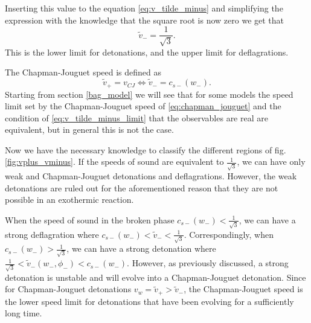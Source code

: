 Inserting this value to the equation \ref{eq:v_tilde_minus} and simplifying the expression with the knowledge that the square root is now zero
we get that
\begin{equation}
\tilde{v}_- = \frac{1}{\sqrt{3}}.
\label{eq:v_tilde_minus_limit}
\end{equation}
This is the lower limit for detonations, and the upper limit for deflagrations.

The Chapman-Jouguet speed is defined as
\begin{equation}
\tilde{v}_+=v_{CJ} \Leftrightarrow \tilde{v}_- = c_{s-}(w_-).
\label{eq:chapman_jouguet}
\end{equation}
Starting from section \ref{bag_model} we will see that for some models the speed limit set by the Chapman-Jouguet speed of \ref{eq:chapman_jouguet}
and the condition of \ref{eq:v_tilde_minus_limit} that the observables are real are equivalent,
but in general this is not the case.

Now we have the necessary knowledge to classify the different regions of fig. \ref{fig:vplus_vminus}.
If the speeds of sound are equivalent to $\frac{1}{\sqrt{3}}$,
we can have only weak and Chapman-Jouguet detonations and deflagrations.
However, the weak detonations are ruled out for the aforementioned reason that they are not possible in an exothermic reaction.

When the speed of sound in the broken phase $c_{s-}(w_-) < \frac{1}{\sqrt{3}}$,
we can have a strong deflagration where $c_{s-}(w_-) < \tilde{v}_- < \frac{1}{\sqrt{3}}$.
Correspondingly, when $c_{s-}(w_-) > \frac{1}{\sqrt{3}}$,
we can have a strong detonation where $\frac{1}{\sqrt{3}} < \tilde{v}_-(w_-, \phi_-) < c_{s-}(w_-)$.
However, as previously discussed, a strong detonation is unstable and will evolve into a Chapman-Jouguet detonation.
Since for Chapman-Jouguet detonations $v_w = \tilde{v}_+ > \tilde{v}_-$,
the Chapman-Jouguet speed is the lower speed limit for detonations that have been evolving for a sufficiently long time.
